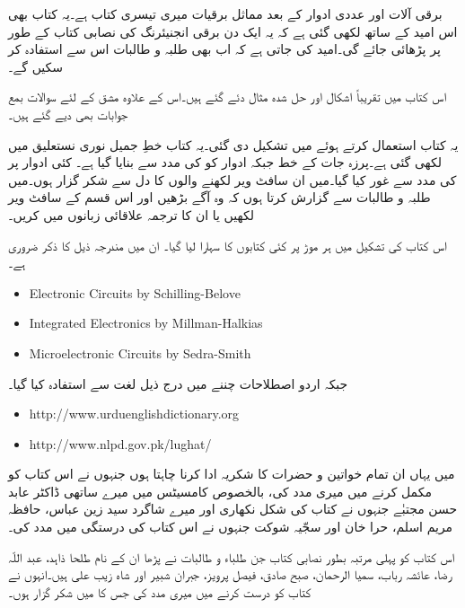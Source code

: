 \thispagestyle{empty}
برقی آلات اور عددی ادوار کے بعد مماثل برقیات میری تیسری کتاب ہے۔یہ کتاب بھی اس امید کے ساتھ لکھی گئی ہے کہ یہ ایک دن برقی انجنیئرنگ کی نصابی کتاب کے طور پر پڑھائی جائے گی۔امید کی جاتی ہے کہ اب بھی طلبہ و طالبات اس سے استفادہ  کر سکیں گے۔

اس کتاب میں تقریباً  اشکال اور  حل شدہ مثال دئے گئے ہیں۔اس کے علاوہ  مشق کے لئے   سوالات  بمع جوابات بھی دیے گئے ہیں۔

یہ کتاب  استعمال  کرتے ہوئے  میں تشکیل دی گئی۔یہ کتاب خطِ جمیل نوری نستعلیق میں لکھی گئی ہے۔پرزہ جات کے خط  جبکہ ادوار کو  کی مدد سے بنایا گیا ہے۔ کئی ادوار پر  کی مدد سے غور کیا گیا۔میں ان سافٹ ویر لکھنے والوں کا دل سے شکر گزار ہوں۔میں طلبہ و طالبات سے گزارش  کرتا ہوں کہ وہ آگے بڑھیں اور اس قسم کے سافٹ ویر لکھیں یا ان کا ترجمہ علاقائی زبانوں میں کریں۔

اس کتاب کی تشکیل میں ہر موڑ پر کئی کتابوں کا سہارا لیا گیا۔ ان میں مندرجہ ذیل کا ذکر ضروری ہے۔
{
\begin{otherlanguage}{english}
\begin{itemize}
\item
Electronic Circuits by Schilling-Belove
\item
Integrated Electronics by Millman-Halkias
\item
Microelectronic Circuits by Sedra-Smith
\end{itemize}
\end{otherlanguage}
}

جبکہ اردو اصطلاحات چننے میں درج ذیل لغت سے استفادہ  کیا گیا۔
{
\begin{otherlanguage}{english}
\begin{itemize}
\item
http:/\!\!/www.urduenglishdictionary.org
\item
http:/\!\!/www.nlpd.gov.pk/lughat/
\end{itemize}
\end{otherlanguage}
}


میں یہاں ان تمام خواتین و حضرات کا شکریہ ادا کرنا چاہتا ہوں جنہوں نے اس کتاب کو مکمل کرنے میں میری مدد کی، بالخصوص کامسیٹس میں میرے ساتھی ڈاکٹر عابد حسن مجتبٰے جنہوں نے کتاب کی شکل نکھاری اور میرے شاگرد سید زین عباس، حافظہ مریم اسلم، حرا خان اور  سجّیہ شوکت  جنہوں نے اس کتاب کی درستگی میں مدد کی۔ 

اس کتاب کو پہلی مرتبہ بطور نصابی کتاب جن طلباء و طالبات نے پڑھا ان کے نام طلحا ذاہد، عبد اللّہ رضا، عائشہ رباب، سمیا الرحمان، صبح صادق، فیصل پرویز، جبران شبیر اور شاہ زیب علی ہیں۔انہوں نے کتاب کو درست کرنے میں میری مدد کی جس کا میں شکر گزار ہوں۔

